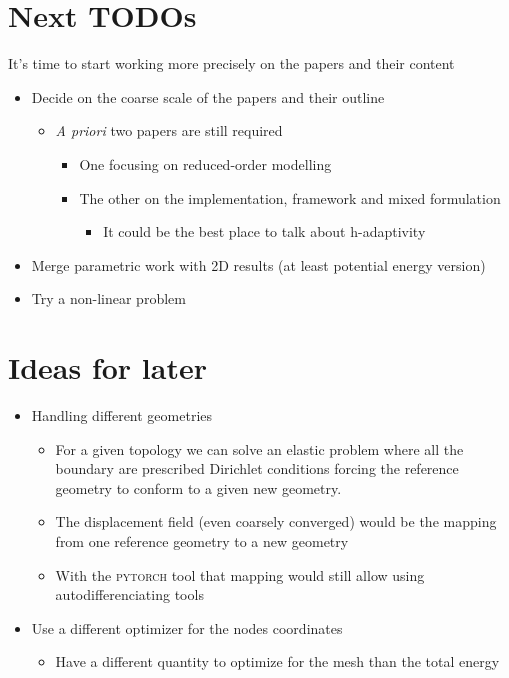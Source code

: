 \section{Next TODOs}
It's time to start working more precisely on the papers and their content
\begin{itemize}
	\item Decide on the coarse scale of the papers and their outline
	\begin{itemize}
		\item \emph{A priori} two papers are still required 
		\begin{itemize}
			\item One focusing on reduced-order modelling
			\item The other on the implementation, framework and mixed formulation
			\begin{itemize}
				\item It could be the best place to talk about h-adaptivity
			\end{itemize}
		\end{itemize}
	\end{itemize}
	\item Merge parametric work with 2D results (at least potential energy version)
	\item Try a non-linear problem
\end{itemize}

\section{Ideas for later}
\begin{itemize}
	\item Handling different geometries
	\begin{itemize}
		\item For a given topology we can solve an elastic problem where all the boundary are prescribed Dirichlet conditions forcing the reference geometry to conform to a given new geometry. 
		\item The displacement field (even coarsely converged) would be the mapping from one reference geometry to a new geometry
		\item With the \textsc{pytorch} tool that mapping would still allow using autodifferenciating tools
	\end{itemize}
	\item Use a different optimizer for the nodes coordinates
	\begin{itemize}
		\item Have a different quantity to optimize for the mesh than the total energy
	\end{itemize}
\end{itemize}